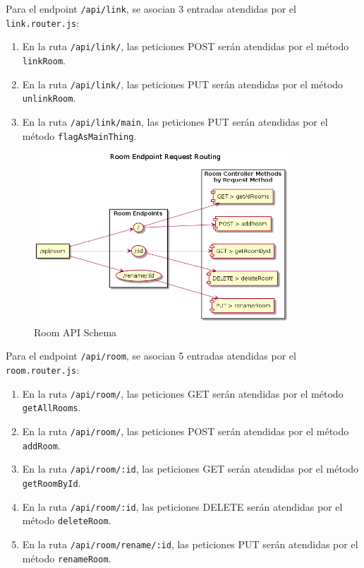 \vspace{0.5cm}

Para el endpoint \verb|/api/link|, se asocian 3 entradas atendidas por el \verb|link.router.js|:
\begin{enumerate}
\item En la ruta \verb|/api/link/|, las peticiones POST serán atendidas por el método \verb|linkRoom|.
\item En la ruta \verb|/api/link/|, las peticiones PUT serán atendidas por el método \verb|unlinkRoom|.
\item En la ruta \verb|/api/link/main|, las peticiones PUT serán atendidas por el método \verb|flagAsMainThing|.
\end{enumerate}

\begin{figure}[hbt!]
\centering
\includegraphics[height=2.5in]{figures/diagrams/back/router-flow/room-endpoints.png}
\caption[room-endpoints]{Room API Schema\footnotemark}
\end{figure}

\vspace{0.5cm}

Para el endpoint \verb|/api/room|, se asocian 5 entradas atendidas por el \verb|room.router.js|:
\begin{enumerate}
\item En la ruta \verb|/api/room/|, las peticiones GET serán atendidas por el método \verb|getAllRooms|.
\item En la ruta \verb|/api/room/|, las peticiones POST serán atendidas por el método \verb|addRoom|.
\item En la ruta \verb|/api/room/:id|, las peticiones GET serán atendidas por el método \verb|getRoomById|.
\item En la ruta \verb|/api/room/:id|, las peticiones DELETE serán atendidas por el método \verb|deleteRoom|.
\item En la ruta \verb|/api/room/rename/:id|, las peticiones PUT serán atendidas por el método \verb|renameRoom|.
\end{enumerate}

